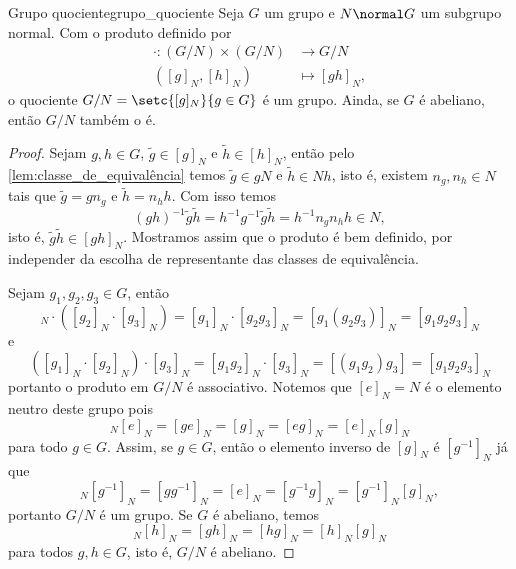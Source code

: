 \begin{proposition}{Grupo quociente}{grupo_quociente}
    Seja \(G\) um grupo e \(N \normal G\) um subgrupo normal. Com o produto definido por
    \begin{align*}
        \cdot : (G/N) \times (G/N) &\to G/N\\
                     ([g]_N,[h]_N) &\mapsto [gh]_N,
    \end{align*}
    o quociente \(G / N = \setc{[g]_N}{g \in G}\) é um grupo. Ainda, se \(G\) é abeliano, então \(G/N\) também o é.
\end{proposition}
\begin{proof}
    Sejam \(g, h \in G\), \(\tilde{g} \in [g]_N\) e \(\tilde{h} \in [h]_N\), então pelo \cref{lem:classe_de_equivalência} temos \(\tilde{g} \in gN\) e \(\tilde{h} \in Nh\), isto é, existem \(n_g,n_h \in N\) tais que \(\tilde{g} = gn_g\) e \(\tilde{h} = n_hh\). Com isso temos
    \begin{equation*}
        (gh)^{-1} \tilde{g}\tilde{h} = h^{-1} g^{-1} \tilde{g} \tilde{h} = h^{-1} n_g n_h h \in N,
    \end{equation*}
    isto é, \(\tilde{g}\tilde{h} \in [gh]_N\). Mostramos assim que o produto é bem definido, por independer da escolha de representante das classes de equivalência.

    Sejam \(g_1,g_2,g_3 \in G\), então
    \begin{equation*}
        [g_1]_N \cdot \left([g_2]_N \cdot [g_3]_N\right) = [g_1]_N \cdot [g_2 g_3]_N = [g_1(g_2 g_3)]_N = [g_1 g_2 g_3]_N
    \end{equation*}
    e
    \begin{equation*}
        \left([g_1]_N \cdot [g_2]_N\right) \cdot [g_3]_N = [g_1 g_2]_N \cdot [g_3]_N = [(g_1 g_2)g_3]= [g_1 g_2 g_3]_N
    \end{equation*}
    portanto o produto em \(G/N\) é associativo. Notemos que \([e]_N = N\) é o elemento neutro deste grupo pois
    \begin{equation*}
        [g]_N [e]_N = [ge]_N = [g]_N = [eg]_N = [e]_N [g]_N
    \end{equation*}
    para todo \(g \in G\). Assim, se \(g \in G\), então o elemento inverso de \([g]_N\) é \([g^{-1}]_N\) já que
    \begin{equation*}
        [g]_N [g^{-1}]_N = [gg^{-1}]_N = [e]_N = [g^{-1}g]_N = [g^{-1}]_N [g]_N,
    \end{equation*}
    portanto \(G/N\) é um grupo. Se \(G\) é abeliano, temos
    \begin{equation*}
        [g]_N [h]_N = [gh]_N = [hg]_N = [h]_N [g]_N
    \end{equation*}
    para todos \(g, h \in G\), isto é, \(G/N\) é abeliano.
\end{proof}

